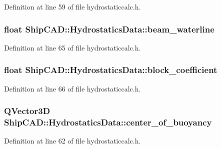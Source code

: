 Definition at line 59 of file hydrostaticcalc.\-h.

\hypertarget{structShipCAD_1_1HydrostaticsData_ab79755f5814572be0dfd3ae3ba214fca}{
\subsubsection[{beam\-\_\-waterline}]{\setlength{\rightskip}{0pt plus 5cm}float Ship\-C\-A\-D\-::\-Hydrostatics\-Data\-::beam\-\_\-waterline}}\label{structShipCAD_1_1HydrostaticsData_ab79755f5814572be0dfd3ae3ba214fca}


Definition at line 65 of file hydrostaticcalc.\-h.

\hypertarget{structShipCAD_1_1HydrostaticsData_ac59c717b9869f0aacca4305fd81d4882}{
\subsubsection[{block\-\_\-coefficient}]{\setlength{\rightskip}{0pt plus 5cm}float Ship\-C\-A\-D\-::\-Hydrostatics\-Data\-::block\-\_\-coefficient}}\label{structShipCAD_1_1HydrostaticsData_ac59c717b9869f0aacca4305fd81d4882}


Definition at line 66 of file hydrostaticcalc.\-h.

\hypertarget{structShipCAD_1_1HydrostaticsData_a316b31598f53f036c7008cc4910293f8}{
\subsubsection[{center\-\_\-of\-\_\-buoyancy}]{\setlength{\rightskip}{0pt plus 5cm}Q\-Vector3\-D Ship\-C\-A\-D\-::\-Hydrostatics\-Data\-::center\-\_\-of\-\_\-buoyancy}}\label{structShipCAD_1_1HydrostaticsData_a316b31598f53f036c7008cc4910293f8}


Definition at line 62 of file hydrostaticcalc.\-h.

